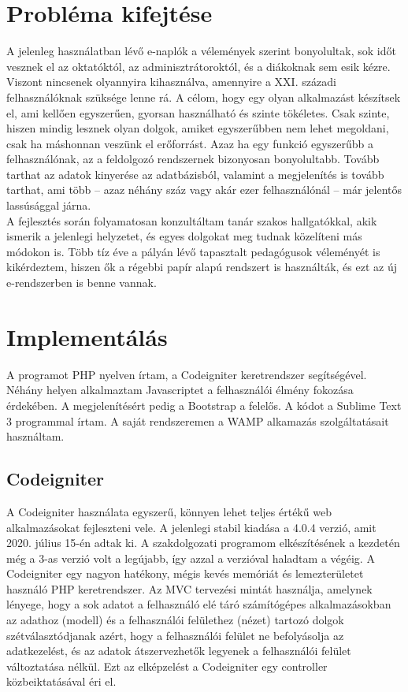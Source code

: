 \documentclass[
]{thesis-ekf}
\begin{document}
\chapter{Probléma kifejtése}
A jelenleg használatban lévő e-naplók a vélemények szerint bonyolultak, sok időt vesznek el az oktatóktól, az adminisztrátoroktól, és a diákoknak sem esik kézre. Viszont nincsenek olyannyira kihasználva, amennyire a XXI. századi felhasználóknak szüksége lenne rá. A célom, hogy egy olyan alkalmazást készítsek el, ami kellően egyszerűen, gyorsan használható és szinte tökéletes. Csak szinte, hiszen mindig lesznek olyan dolgok, amiket egyszerűbben nem lehet megoldani, csak ha máshonnan veszünk el erőforrást. Azaz ha egy funkció egyszerűbb a felhasználónak, az a feldolgozó rendszernek bizonyosan bonyolultabb. Tovább tarthat az adatok kinyerése az adatbázisból, valamint a megjelenítés is tovább tarthat, ami több -- azaz néhány száz vagy akár ezer felhasználónál -- már jelentős lassúsággal járna.\\
A fejlesztés során folyamatosan konzultáltam tanár szakos hallgatókkal, akik ismerik a jelenlegi helyzetet, és egyes dolgokat meg tudnak közelíteni más módokon is. Több tíz éve a pályán lévő tapasztalt pedagógusok véleményét is kikérdeztem, hiszen ők a régebbi papír alapú rendszert is használták, és ezt az új e-rendszerben is benne vannak.
\chapter{Implementálás}
A programot PHP nyelven írtam, a Codeigniter keretrendszer segítségével. Néhány helyen alkalmaztam Javascriptet a felhasználói élmény fokozása érdekében. A megjelenítésért pedig a Bootstrap a felelős. A kódot a Sublime Text 3 programmal írtam. A saját rendszeremen a WAMP alkamazás szolgáltatásait használtam.
\section{Codeigniter}
A Codeigniter használata egyszerű, könnyen lehet teljes értékű web alkalmazásokat fejleszteni vele. A jelenlegi stabil kiadása a 4.0.4 verzió, amit 2020. július 15-én adtak ki. A szakdolgozati programom elkészítésének a kezdetén még a 3-as verzió volt a legújabb, így azzal a verzióval haladtam a végéig.
A Codeigniter egy nagyon hatékony, mégis kevés memóriát és lemezterületet használó PHP keretrendszer. Az MVC tervezési mintát használja, amelynek lényege, hogy a sok adatot a felhasználó elé táró számítógépes alkalmazásokban az adathoz (modell) és a felhasználói felülethez (nézet) tartozó dolgok szétválasztódjanak azért, hogy a felhasználói felület ne befolyásolja az adatkezelést, és az adatok átszervezhetők legyenek a felhasználói felület változtatása nélkül. Ezt az elképzelést a Codeigniter egy controller közbeiktatásával éri el.
\end{document}
